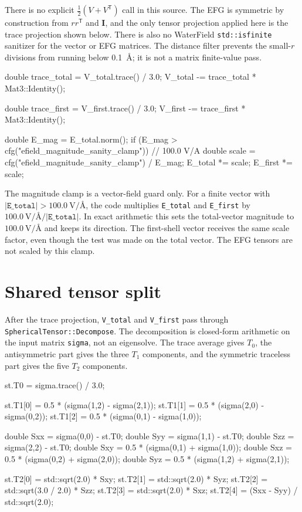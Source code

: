 \documentclass[11pt]{article}
\newcommand{\code}[1]{\texttt{#1}}
\begin{document}
There is no explicit \(\frac12(V+V^{\mathsf T})\) call in this source. The EFG
is symmetric by construction from \(r r^{\mathsf T}\) and \(\bm I\), and the
only tensor projection applied here is the trace projection shown below. There
is also no WaterField \code{std::isfinite} sanitizer for the vector or EFG
matrices. The distance filter prevents the small-\(r\) divisions from running
below \SI{0.1}{\angstrom}; it is not a matrix finite-value pass.

\begin{codebox}
double trace_total = V_total.trace() / 3.0;
V_total -= trace_total * Mat3::Identity();

double trace_first = V_first.trace() / 3.0;
V_first -= trace_first * Mat3::Identity();

double E_mag = E_total.norm();
if (E_mag > cfg("efield_magnitude_sanity_clamp")) {   // 100.0 V/A
    double scale = cfg("efield_magnitude_sanity_clamp") / E_mag;
    E_total *= scale;
    E_first *= scale;
}
\end{codebox}

The magnitude clamp is a vector-field guard only. For a finite vector with
\(|\code{E\_total}|>\SI{100.0}{\volt\per\angstrom}\), the code multiplies
\code{E\_total} and \code{E\_first} by
\(\SI{100.0}{\volt\per\angstrom}/|\code{E\_total}|\). In exact arithmetic this
sets the total-vector magnitude to \(\SI{100.0}{\volt\per\angstrom}\) and keeps
its direction. The first-shell vector receives the same scale factor, even
though the test was made on the total vector. The EFG tensors are not scaled by
this clamp.

\section{Shared tensor split}

After the trace projection, \code{V\_total} and \code{V\_first} pass through
\code{SphericalTensor::Decompose}. The decomposition is closed-form arithmetic
on the input matrix \code{sigma}, not an eigensolve. The trace average gives
\(T_0\), the antisymmetric part gives the three \(T_1\) components, and the
symmetric traceless part gives the five \(T_2\) components.

\begin{codebox}
st.T0 = sigma.trace() / 3.0;

st.T1[0] = 0.5 * (sigma(1,2) - sigma(2,1));
st.T1[1] = 0.5 * (sigma(2,0) - sigma(0,2));
st.T1[2] = 0.5 * (sigma(0,1) - sigma(1,0));

double Sxx = sigma(0,0) - st.T0;
double Syy = sigma(1,1) - st.T0;
double Szz = sigma(2,2) - st.T0;
double Sxy = 0.5 * (sigma(0,1) + sigma(1,0));
double Sxz = 0.5 * (sigma(0,2) + sigma(2,0));
double Syz = 0.5 * (sigma(1,2) + sigma(2,1));

st.T2[0] = std::sqrt(2.0) * Sxy;
st.T2[1] = std::sqrt(2.0) * Syz;
st.T2[2] = std::sqrt(3.0 / 2.0) * Szz;
st.T2[3] = std::sqrt(2.0) * Sxz;
st.T2[4] = (Sxx - Syy) / std::sqrt(2.0);
\end{codebox}
\end{document}
